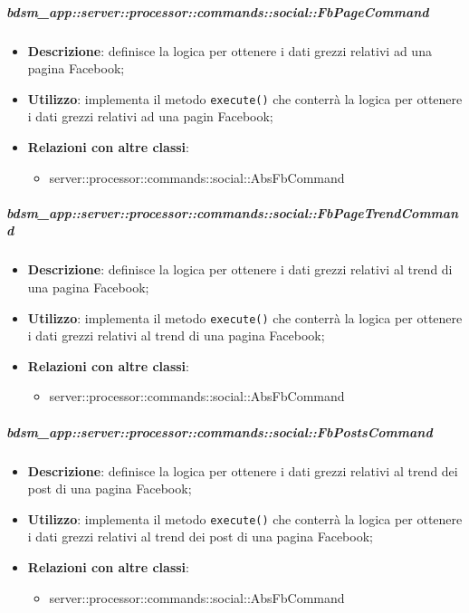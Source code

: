         \subparagraph{bdsm\_app::server::processor::commands::social::FbPageCommand} %
        \label{subp:bdsm_app_server_processor_commands_social_fbpagecommand}
        \begin{itemize}
          \item \textbf{Descrizione}: definisce la logica per ottenere i dati grezzi relativi ad una pagina Facebook;
          \item \textbf{Utilizzo}: implementa il metodo \texttt{execute()} che conterrà la logica per ottenere i dati grezzi relativi ad una pagin Facebook;
          \item \textbf{Relazioni con altre classi}:
            \begin{itemize}
              \item server::processor::commands::social::AbsFbCommand
            \end{itemize}
        \end{itemize}

        \subparagraph{bdsm\_app::server::processor::commands::social::FbPageTrendCommand} %
        \label{subp:bdsm_app_server_processor_commands_social_fbpagetrendcommand}
        \begin{itemize}
          \item \textbf{Descrizione}: definisce la logica per ottenere i dati grezzi relativi al trend di una pagina Facebook;
          \item \textbf{Utilizzo}: implementa il metodo \texttt{execute()} che conterrà la logica per ottenere i dati grezzi relativi al trend di una pagina Facebook;
          \item \textbf{Relazioni con altre classi}:
            \begin{itemize}
              \item server::processor::commands::social::AbsFbCommand
            \end{itemize}
        \end{itemize}

        \subparagraph{bdsm\_app::server::processor::commands::social::FbPostsCommand} %
        \label{subp:bdsm_app_server_processor_commands_social_fbpostscommand}
        \begin{itemize}
          \item \textbf{Descrizione}: definisce la logica per ottenere i dati grezzi relativi al trend dei post di una pagina Facebook;
          \item \textbf{Utilizzo}: implementa il metodo \texttt{execute()} che conterrà la logica per ottenere i dati grezzi relativi al trend dei post di una pagina Facebook;
          \item \textbf{Relazioni con altre classi}:
            \begin{itemize}
              \item server::processor::commands::social::AbsFbCommand
            \end{itemize}
        \end{itemize}


